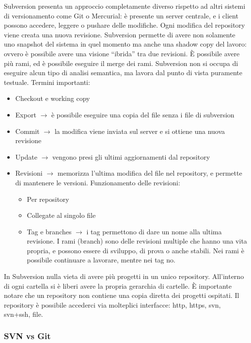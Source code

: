 Subversion presenta un approccio completamente diverso rispetto ad altri sistemi di versionamento come Git o Mercurial: \`e presente un server centrale, e i client possono accedere, leggere o pushare delle modifiche. Ogni modifica del repository viene creata una nuova revisione. Subversion permette di avere non solamente uno snapshot del sistema in quel momento ma anche una shadow copy del lavoro: ovvero \`e possibile avere una visione ``ibrida'' tra due revisioni. \`E possibile avere pi\`u rami, ed \`e possibile eseguire il merge dei rami.
Subversion non si occupa di eseguire alcun tipo di analisi semantica, ma lavora dal punto di vista puramente testuale.
Termini importanti:
\begin{itemize}

\item Checkout e working copy
\item Export $\to$ \`e possibile eseguire una copia del file senza i file di subversion
\item Commit $\to$ la modifica viene inviata sul server e si ottiene una nuova revisione
\item Update $\to$ vengono presi gli ultimi aggiornamenti dal repository
\item Revisioni $\to$ memorizza l'ultima modifica del file nel repository, e permette di mantenere le versioni. Funzionamento delle revisioni:
  \begin{itemize}
    
  \item Per repository
  \item Collegate al singolo file
  \item Tag e branches $\to$ i tag permettono di dare un nome alla ultima revisione. I rami (branch) sono delle revisioni multiple che hanno una vita propria, e possono essere di sviluppo, di prova o anche stabili. Nei rami \`e possibile continuare a lavorare, mentre nei tag no.
    
  \end{itemize}

\end{itemize}

In Subversion nulla vieta di avere pi\`u progetti in un unico repository. All'interno di ogni cartella si \`e liberi avere la propria gerarchia di cartelle. \`E importante notare che un repository non contiene una copia diretta dei progetti ospitati. Il repository \`e possibile accederci via molteplici interfacce: http, https, svn, svn+ssh, file.

\subsubsection{SVN vs Git}

